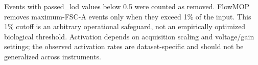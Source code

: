 \documentclass[ASNA]{latex/wiley/USG}
\begin{document}
\endgroup

\clearpage
\begin{landscape}
\begingroup
\scriptsize
\setlength{\tabcolsep}{3pt}
\renewcommand{\arraystretch}{1.12}

\captionsetup{type=table}
\begingroup
\renewcommand{\thetable}{S3}
\endgroup

Events with passed\_lod values below 0.5 were counted as removed.
FlowMOP removes maximum-FSC-A events only when they exceed 1\% of the
input. This 1\% cutoff is an arbitrary operational safeguard, not an
empirically optimized biological threshold. Activation depends on
acquisition scaling and voltage/gain settings; the observed activation
rates are dataset-specific and should not be generalized across
instruments.


\end{landscape}
\end{document}
